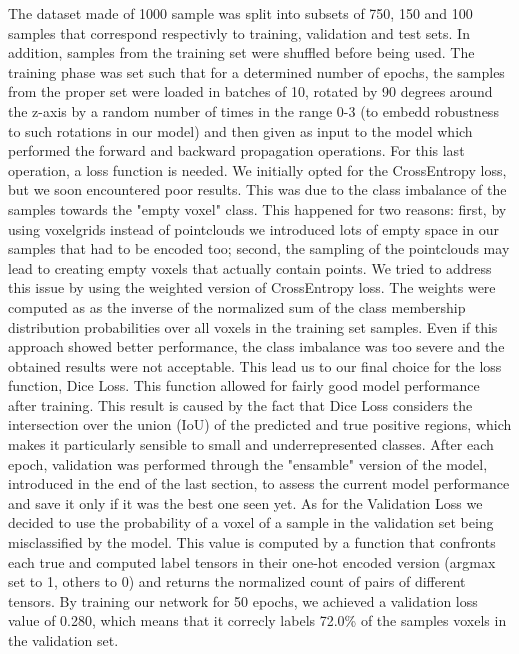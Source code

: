 The dataset made of 1000 sample was split into subsets of 750, 150 and 100 samples that correspond respectivly
to training, validation and test sets. In addition, samples from the training set were shuffled before being used.
The training phase was set such that for a determined number of epochs, the samples from the proper
set were loaded in batches of 10, rotated by 90 degrees around the z-axis by a random number
of times in the range 0-3 (to embedd robustness to such rotations in our model) and then given as 
input to the model which performed the forward and backward propagation operations.
For this last operation, a loss function is needed.
We initially opted for the CrossEntropy loss, but we soon encountered poor results. This was due to the class imbalance of the
samples towards the "empty voxel" class. This happened for two reasons: first, by using voxelgrids instead of pointclouds
we introduced lots of empty space in our samples that had to be encoded too; second, the sampling of the pointclouds may lead 
to creating empty voxels that actually contain points.
We tried to address this issue by using the weighted version of CrossEntropy loss.
The weights were computed as as the inverse of the normalized sum of the class membership distribution probabilities 
over all voxels in the training set samples.
Even if this approach showed better performance, the class imbalance was too severe and the obtained results were not acceptable.
This lead us to our final choice for the loss function, Dice Loss.
This function allowed for fairly good model performance after training. This result is caused by the fact that Dice Loss considers 
the intersection over the union (IoU) of the predicted and true positive regions, which makes it particularly sensible to small 
and underrepresented classes.
After each epoch, validation was performed through the "ensamble" version of the model, introduced in the end of the last section,
to assess the current model performance and save it only if it was the best one seen yet. 
As for the Validation Loss we decided to use the probability of a voxel of a sample in the validation set being misclassified by the model.
This value is computed by a function that confronts each true and computed label tensors in their one-hot encoded version 
(argmax set to 1, others to 0) and returns the normalized count of pairs of different tensors.
By training our network for 50 epochs, we achieved a validation loss value of 0.280, which
means that it correcly labels 72.0\% of the samples voxels in the validation set.